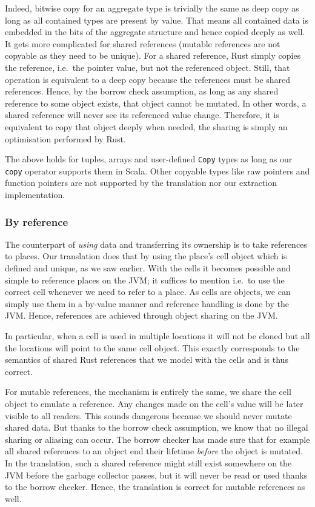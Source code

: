 Indeed, bitwise copy for an aggregate type is trivially the same as deep
copy as long as all contained types are present by value. That means all
contained data is embedded in the bits of the aggregate structure and
hence copied deeply as well. It gets more complicated for shared
references (mutable references are not copyable as they need to be
unique). For a shared reference, Rust simply copies the reference,
i.e.~the pointer value, but not the referenced object. Still, that
operation is equivalent to a deep copy because the references must be
shared references. Hence, by the borrow check assumption, as long as any
shared reference to some object exists, that object cannot be mutated.
In other words, a shared reference will never see its referenced value
change. Therefore, it is equivalent to copy that object deeply when
needed, the sharing is simply an optimisation performed by Rust.

The above holds for tuples, arrays and user-defined
\passthrough{\lstinline!Copy!} types as long as our
\passthrough{\lstinline!copy!} operator supports them in Scala. Other
copyable types like raw pointers and function pointers are not supported
by the translation nor our extraction implementation.

\subsubsection{By reference}

The counterpart of \emph{using} data and transferring its ownership is
to take references to places. Our translation does that by using the
place's cell object which is defined and unique, as we saw earlier. With
the cells it becomes possible and simple to reference places on the JVM;
it suffices to mention i.e.~to use the correct cell whenever we need to
refer to a place. As cells are objects, we can simply use them in a
by-value manner and reference handling is done by the JVM. Hence,
references are achieved through object sharing on the JVM.

In particular, when a cell is used in multiple locations it will not be
cloned but all the locations will point to the same cell object. This
exactly corresponds to the semantics of shared Rust references that we
model with the cells and is thus correct.

For mutable references, the mechanism is entirely the same, we share the
cell object to emulate a reference. Any changes made on the cell's value
will be later visible to all readers. This sounds dangerous because we
should never mutate shared data. But thanks to the borrow check
assumption, we know that no illegal sharing or aliasing can occur. The
borrow checker has made sure that for example all shared references to
an object end their lifetime \emph{before} the object is mutated. In the
translation, such a shared reference might still exist somewhere on the
JVM before the garbage collector passes, but it will never be read or
used thanks to the borrow checker. Hence, the translation is correct for
mutable references as well.





